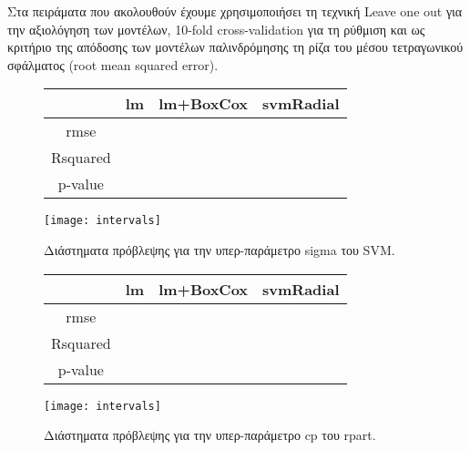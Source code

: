 Στα πειράματα που ακολουθούν έχουμε χρησιμοποιήσει τη τεχνική Leave one out για την αξιολόγηση των μοντέλων, 10-fold cross-validation για τη ρύθμιση και ως κριτήριο της απόδοσης των μοντέλων παλινδρόμησης τη ρίζα του μέσου τετραγωνικού σφάλματος (root mean squared error).
\begin{figure}[H]
\begin{minipage}{0.48\textwidth}
		\noindent
		\begin{center}
				\begin{tabular}{ |c|c|c|c| } 
					\hline
					& lm & lm+BoxCox & svmRadial\\
					\hline
					rmse & & &\\
					\hline
					Rsquared & & & \\
					\hline 
					p-value & & &\\				
					\hline
				\end{tabular}   
		\end{center}
\end{minipage} \qquad
\begin{minipage}{0.48\textwidth}
		\centering
          \texttt{[image: intervals]}
		\caption{Διάστηματα πρόβλεψης για την υπερ-παράμετρο sigma του SVM.}	
\end{minipage}
\begin{minipage}{0.48\textwidth}
	\noindent
	\begin{center}
		\begin{tabular}{ |c|c|c|c| } 
			\hline
			& lm & lm+BoxCox & svmRadial\\
			\hline
			rmse & & &\\
			\hline
			Rsquared & & & \\
			\hline 
			p-value & & &\\				
			\hline
		\end{tabular}   
	\end{center}
\end{minipage} \qquad
\begin{minipage}{0.48\textwidth}
	 	\centering
\texttt{[image: intervals]}
	 	\caption{Διάστηματα πρόβλεψης για την υπερ-παράμετρο cp του rpart.}	
\end{minipage}
\begin{minipage}{0.48\textwidth}
	\noindent
	\begin{center}

\end{center}
\end{minipage}
\end{figure}
